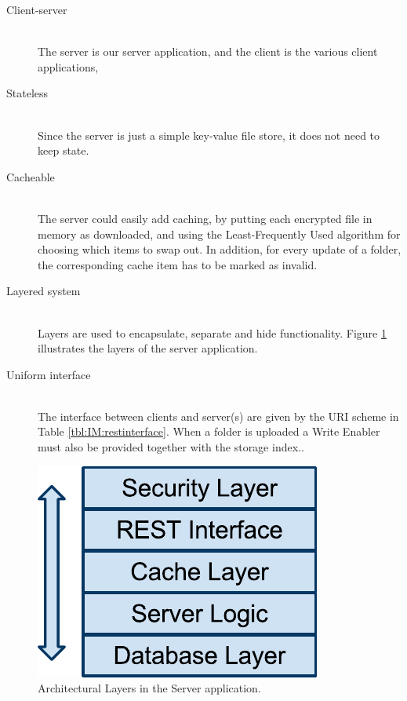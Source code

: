 \documentclass[pdftex,english,10pt,b5paper,twoside]{book}
\begin{document}
\begin{description}
  \item[Client-server] \hfill \\
    The server is our server application, and the client is the various client
    applications,

  \item[Stateless] \hfill \\
    Since the server is just a simple key-value file store, it does
    not need to keep state.

  \item[Cacheable] \hfill \\
    The server could easily add caching, by putting each encrypted file in
    memory as downloaded, and using the Least-Frequently Used algorithm for
    choosing which items to swap out. In addition, for every update of a folder,
    the corresponding cache item has to be marked as invalid.

  \item[Layered system] \hfill \\
    Layers are used to encapsulate, separate and hide functionality.
    Figure \ref{fig:IM:layers} illustrates the layers of the server application.

  \item[Uniform interface] \hfill \\
    The interface between clients and server(s) are given by the URI scheme in
    Table \ref{tbl:IM:restinterface}. When a folder is uploaded a Write Enabler
    must also be provided together with the storage index..
\end{description}

\begin{figure}[h!]
    \centering
    \includegraphics[scale=0.6]{ImplementationServerLayers.pdf}
    \caption{Architectural Layers in the Server application.}
    \label{fig:IM:layers}
\end{figure}
\end{document}
